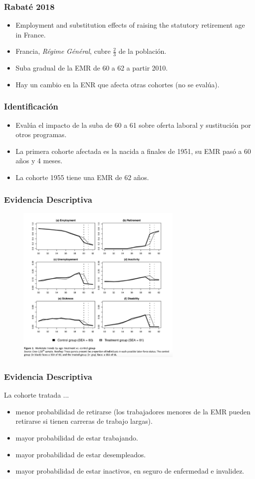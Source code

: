 \documentclass{beamer}
\begin{document}
  \frame
  {
     \frametitle{Rabaté 2018}
     \begin{itemize}
       \item Employment and substitution effects of raising the statutory retirement age in France.
       \item Francia, \textit{Régime Général}, cubre $\frac{2}{3}$ de la población.
       \item Suba gradual de la EMR de 60 a 62 a partir 2010.
       \item Hay un cambio en la ENR que afecta otras cohortes (no se evalúa).
     \end{itemize}
  }
  \frame
  {
    \frametitle{Identificación}
      \begin{itemize}
        \item Evalúa el impacto de la suba de 60 a 61 sobre oferta laboral y sustitución por otros programas.
        \item La primera cohorte afectada es la nacida a finales de 1951, su EMR pasó a 60 años y 4 meses.
       \item La cohorte 1955 tiene una EMR de 62 años.
     \end{itemize}
  }
  \frame
  {
    \frametitle{Evidencia Descriptiva}
      \begin{figure}[htp]
        \centering
        \includegraphics[width=8cm]{imgs/rabate-fig2}
        \label{fig:fig2}
      \end{figure}
  }
  \frame
  {
    \frametitle{Evidencia Descriptiva}
    La cohorte tratada ...
        \begin{itemize}
        \item  menor probabilidad de retirarse (los trabajadores menores de la EMR pueden retirarse si tienen carreras de trabajo largas).
        \item  mayor probabilidad de estar trabajando.
        \item  mayor probabilidad de estar desempleados.
        \item  mayor probabilidad de estar inactivos, en seguro de enfermedad e invalidez.
     \end{itemize}
    
  }
\end{document}
